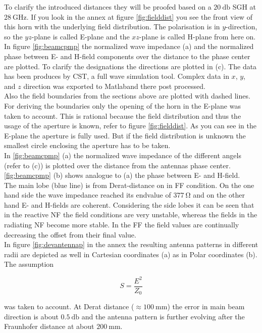 To clarify the introduced distances they will be proofed based on a $\SI{20}{\decibel}$ \ac{SGH} at $\SI{28}{\giga\hertz}$. If you look in the annex at figure \ref{fig:fielddist} you see the front view of this horn with the underlying field distribution. The polarisation is in $y$-direction, so the $yz$-plane is called E-plane and the $xz$-plane is called H-plane from here on.\\
In figure \ref{fig:beamcpmp} the normalized wave impedance (a) and the normalized phase between E- and H-field components over the distance to the phase center are plotted. To clarify the designations the directions are plotted in (c). The data has been produces by CST\texttrademark , a full wave simulation tool. Complex data in $x$, $y$, and $z$ direction was exported to Matlab\texttrademark and there post processed.\\
Also the field boundaries from the sections above are plotted with dashed lines. For deriving the boundaries only the opening of the horn in the E-plane was taken to account. This is rational because the field distribution and thus the usage of the aperture is known, refer to figure \ref{fig:fielddist}. As you can see in the E-plane the aperture is fully used. But if the field distribution is unknown the smallest circle enclosing the aperture has to be taken.\\
In \ref{fig:beamcpmp} (a) the normalized wave impedance of the different angels (refer to (c)) is plotted over the distance from the antennas phase center. \ref{fig:beamcpmp} (b) shows analogue to (a) the phase between E- and H-field.\\
The main lobe (blue line) is from Derat-distance on in \ac{FF} condition. On the one hand side the wave impedance reached its endvalue of $\SI{377}{\ohm}$ and on the other hand E- and H-fields are coherent. Considering the side lobes it can be seen that in the reactive \ac{NF} the field conditions are very unstable, whereas the fields in the radiating \ac{NF} become more stable. In the \ac{FF} the field values are continually decreasing the offset from their final value.\\
In figure \ref{fig:devantennap} in the annex the resulting antenna patterns in different radii are depicted as well in Cartesian coordinates (a) as in Polar coordinates (b). The assumption 

\begin{equation}
S = \frac{E^2}{Z_0}
\end{equation}

was taken to account. At Derat distance ($\approx\SI{100}{\milli\meter}$) the error in main beam direction is about $\SI{0.5}{\decibel}$ and the antenna pattern is further evolving after the Fraunhofer distance at about $\SI{200}{\milli\meter}$.

